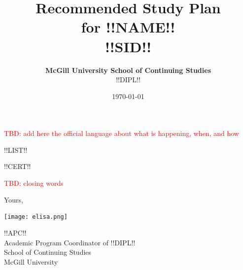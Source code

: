 \documentclass{article}
\title{Recommended Study Plan \\ for {\bf !!NAME!!} \\ {\small !!SID!!} }
\date{\today}
\author{{\bf McGill University School of Continuing Studies} \\
  !!DIPL!!}
\begin{document}
\maketitle

\thispagestyle{fancy}

\textcolor{red}{TBD: add here the official language about what is happening, when, and how}

!!LIST!!

!!CERT!!

\newpage

\textcolor{red}{TBD: closing words}

Yours,

\hspace*{3mm}\texttt{[image: elisa.png]}

\vspace*{-7mm}
!!APC!! \\
Academic Program Coordinator of !!DIPL!! \\
School of Continuing Studies \\
McGill University

\label{LastPage}
\end{document}
